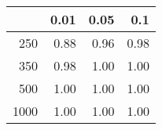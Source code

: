 % 
\begin{tabular}{rrrr}
  \hline
 & 0.01 & 0.05 & 0.1 \\ 
  \hline
250 & 0.88 & 0.96 & 0.98 \\ 
  350 & 0.98 & 1.00 & 1.00 \\ 
  500 & 1.00 & 1.00 & 1.00 \\ 
  1000 & 1.00 & 1.00 & 1.00 \\ 
   \hline
\end{tabular}
